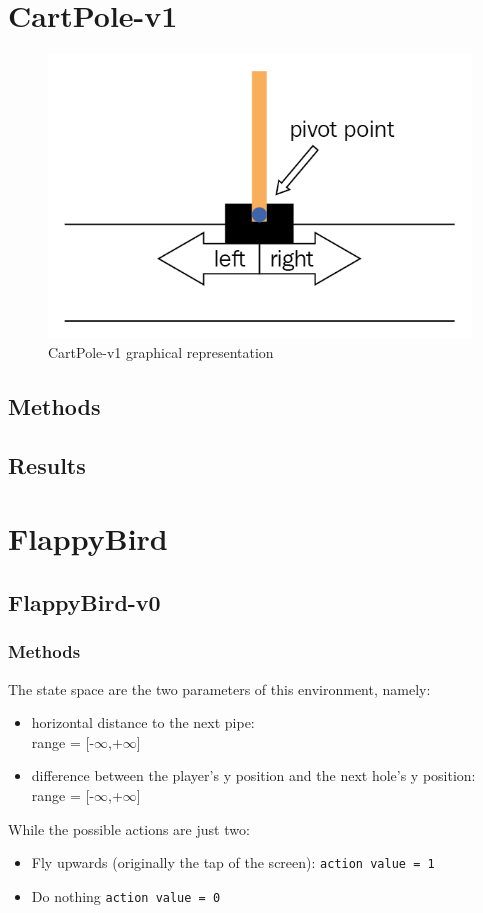 \documentclass[11pt,a4paper,twocolumn]{IEEEtran}
\begin{document}
	\section{\textbf{CartPole-v1}}
		\begin{figure}[h]
			\centering
			\includegraphics[width=0.75\linewidth]{../imgs/cartpole}
			\caption{CartPole-v1 graphical representation}
		\end{figure}
		\subsection{\textbf{Methods}}
		\subsection{\textbf{Results}}
		
	\section{\textbf{FlappyBird}}
		\subsection{\textbf{FlappyBird-v0}}
			\subsubsection{\textbf{Methods}}
			The state space are the two parameters of this environment, namely:
			\begin{itemize}
				\item horizontal distance to the next pipe:\\ range = [-$\infty$,+$\infty$]
				\item difference between the player's y position and the next hole's y position:\\ range = [-$\infty$,+$\infty$]
			\end{itemize}
			While the possible actions are just two:
			\begin{itemize}
				\item Fly upwards (originally the tap of the screen): \texttt{action value = 1}
				\item Do nothing \texttt{action value = 0}
			\end{itemize}
		
\end{document}

